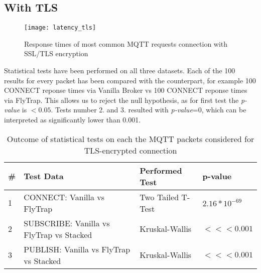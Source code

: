 \subsection{With TLS}
\begin{figure}[h]
    \centering
    \texttt{[image: latency\_tls]}
    \caption{Response times of most common MQTT requests connection with SSL/TLS encryption}
    \label{fig:latency_tls}
\end{figure}

Statistical tests have been performed on all three datasets. Each of the 100 results for every packet has been compared with the counterpart, for example 100 CONNECT reponse times via Vanilla Broker vs 100 CONNECT reponse times via FlyTrap. This allows us to reject the null hypothesis, as for first test the \textit{p-value} is $<0.05$. Tests number 2. and 3. resulted with \textit{p-value}=0, which can be interpreted as significantly lower than 0.001.

\begin{table}[]
\centering
\begin{tabular}{|l|l|l|l|}
\hline
\textbf{\#} & \textbf{Test Data}                       & \textbf{Performed Test} & \textbf{p-value}                      \\ \hline
1           & CONNECT: Vanilla vs FlyTrap              & Two Tailed T-Test       & $2.16*10^{-69}$                    \\ \hline
2           & SUBSCRIBE: Vanilla vs FlyTrap vs Stacked & Kruskal-Wallis          & $<<< 0.001$ \\ \hline
3           & PUBLISH: Vanilla vs FlyTrap vs Stacked & Kruskal-Wallis          & $<<< 0.001$ \\ \hline
\end{tabular}
\caption{Outcome of statistical tests on each the MQTT packets considered for TLS-encrypted connection}
\label{tab:ttest-tls}
\end{table}

